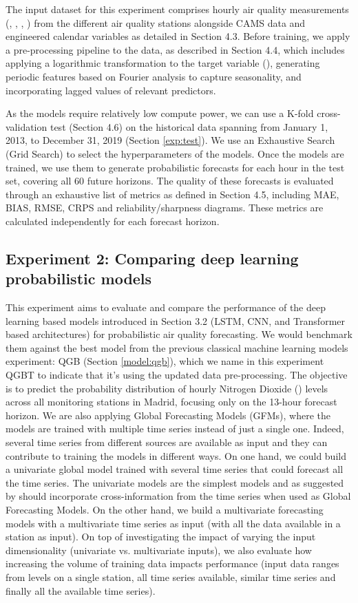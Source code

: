\documentclass[12pt,a4paper]{book}
\begin{document}
The input dataset for this experiment comprises hourly air quality measurements (\no{}, \ot{}, \pmtwo{}, \pmten{}) from the different air quality stations alongside CAMS data and engineered calendar variables as detailed in Section 4.3. Before training, we apply a pre-processing pipeline to the data, as described in Section 4.4, which includes applying a logarithmic transformation to the target variable (\no{}), generating periodic features based on Fourier analysis to capture seasonality, and incorporating lagged values of relevant predictors.

As the models require relatively low compute power, we can use a K-fold cross-validation test (Section 4.6) on the historical data spanning from January 1, 2013, to December 31, 2019 (Section \ref{exp:test}). We use an Exhaustive Search (Grid Search) to select the hyperparameters of the models. Once the models are trained, we use them to generate probabilistic forecasts for each hour in the test set, covering all 60 future horizons. The quality of these forecasts is evaluated through an exhaustive list of metrics as defined in Section 4.5, including MAE, BIAS, RMSE, CRPS and reliability/sharpness diagrams. These metrics are calculated independently for each forecast horizon.

\subsection{Experiment 2: Comparing deep learning probabilistic models}

This experiment aims to evaluate and compare the performance of the deep learning based models introduced in Section 3.2 (LSTM, CNN, and Transformer based architectures) for probabilistic air quality forecasting. We would benchmark them against the best model from the previous classical machine learning models experiment: QGB (Section \ref{model:qgb}), which we name in this experiment QGBT to indicate that it's using the updated data pre-processing. The objective is to predict the probability distribution of hourly Nitrogen Dioxide (\no{}) levels across all monitoring stations in Madrid, focusing only on the 13-hour forecast horizon. We are also applying Global Forecasting Models (GFMs), where the models are trained with multiple time series instead of just a single one. Indeed, several time series from different sources are available as input and they can contribute to training the models in different ways. On one hand, we could build a univariate global model trained with several time series that could forecast all the \no{} time series. The univariate models are the simplest models and as suggested by \citet{hewamalage_recurrent_2021} should incorporate cross-information from the time series when used as Global Forecasting Models. On the other hand, we build a multivariate forecasting models with a multivariate time series as input (with all the data available in a station as input). On top of investigating the impact of varying the input dimensionality (univariate vs. multivariate inputs), we also evaluate how increasing the volume of training data impacts performance (input data ranges from \no{} levels on a single station, all \no{} time series available, similar time series and finally all the available time series). 
\end{document}
